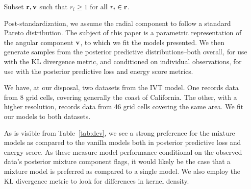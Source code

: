 \begin{algorithm}
  \label{algo:processing}
  Subset ${\bf r},{\bf v}$ such that $r_i \geq 1$ for all $r_i\in {\bf r}$.\\
\end{algorithm}

Post-standardization, we assume the radial component to follow a standard Pareto distribution.  The
  subject of this paper is a parametric representation of the angular component ${\bf v}$, to which
  we fit the models presented.  We then generate samples from the posterior predictive
  distributions--both overall, for use with the KL divergence metric, and conditioned on individual
  observations, for use with the posterior predictive loss and energy score metrics.

We have, at our disposal, two datasets from the IVT model.  One records data from 8 grid cells,
  covering generally the coast of California.  The other, with a higher resolution, records data
  from 46 grid cells covering the same area.  We fit our models to both datasets.

\begin{table}[h]
  \label{tab:dev}
  
\end{table}

As is visible from Table~\ref{tab:dev}, we see a strong preference for the mixture models as
  compared to the vanilla models both in posterior predictive loss and energy score.  As these
  measure model performance conditional on the observed data's posterior mixture component flags,
  it would likely be the case that a mixture model is preferred as compared to a single model.  We
  also employ the KL divergence metric to look for differences in kernel density.

